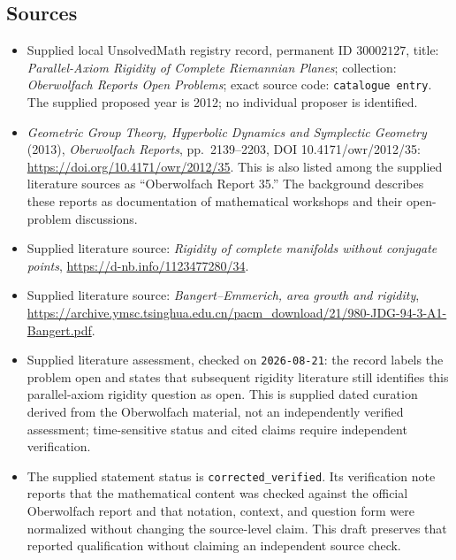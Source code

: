 \documentclass[11pt]{article}
\begin{document}
\subsection{Sources}
\begin{itemize}
\item Supplied local UnsolvedMath registry record, permanent ID \(30002127\), title: \emph{Parallel-Axiom Rigidity of Complete Riemannian Planes}; collection: \emph{Oberwolfach Reports Open Problems}; exact source code: \texttt{catalogue entry}. The supplied proposed year is 2012; no individual proposer is identified.
\item \emph{Geometric Group Theory, Hyperbolic Dynamics and Symplectic Geometry} (2013), \emph{Oberwolfach Reports}, pp.\ 2139--2203, DOI 10.4171/owr/2012/35: \url{https://doi.org/10.4171/owr/2012/35}. This is also listed among the supplied literature sources as ``Oberwolfach Report 35.'' The background describes these reports as documentation of mathematical workshops and their open-problem discussions.
\item Supplied literature source: \emph{Rigidity of complete manifolds without conjugate points}, \url{https://d-nb.info/1123477280/34}.
\item Supplied literature source: \emph{Bangert--Emmerich, area growth and rigidity}, \url{https://archive.ymsc.tsinghua.edu.cn/pacm_download/21/980-JDG-94-3-A1-Bangert.pdf}.
\item Supplied literature assessment, checked on \texttt{2026-08-21}: the record labels the problem open and states that subsequent rigidity literature still identifies this parallel-axiom rigidity question as open. This is supplied dated curation derived from the Oberwolfach material, not an independently verified assessment; time-sensitive status and cited claims require independent verification.
\item The supplied statement status is \texttt{corrected\_verified}. Its verification note reports that the mathematical content was checked against the official Oberwolfach report and that notation, context, and question form were normalized without changing the source-level claim. This draft preserves that reported qualification without claiming an independent source check.
\end{itemize}
\end{document}
